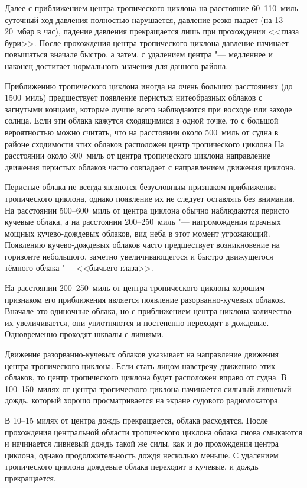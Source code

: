 Далее с приближением центра тропического циклона на расстояние
60--110~миль суточный ход давления полностью нарушается, давление
резко падает (на 13--20~мбар в час), падение давления прекращается лишь
при прохождении <<глаза бури>>. После прохождения центра тропического
циклона давление начинает повышаться вначале быстро, а затем, с
удалением центра "--- медленнее и наконец достигает нормального значения
для данного района.

 Приближению тропического циклона иногда на очень больших
расстояниях (до 1500~миль) предшествует появление перистых
нитеобразных облаков с загнутыми концами, которые лучше всего
наблюдаются при восходе или заходе солнца. Если эти облака кажутся
сходящимися в одной точке, то с большой вероятностью можно считать,
что на расстоянии около 500~миль от судна в районе сходимости этих
облаков расположен центр тропического циклона На расстоянии около 300~миль
от центра тропического циклона направление движения перистых
облаков часто совпадает с направлением движения циклона.

Перистые облака не всегда являются безусловным признаком приближения
тропического циклона, однако появление их не следует оставлять без
внимания. На расстоянии 500--600~миль от центра циклона обычно
наблюдаются перисто кучевые облака, а на расстоянии 200--250~миль "---
нагромождения мрачных мощных кучево-дождевых облаков, вид неба в этот
момент угрожающий. Появлению кучево-дождевых облаков часто
предшествует возникновение на горизонте небольшого, заметно
увеличивающегося и быстро движущегося тёмного облака "--- <<бычьего
глаза>>.

На расстоянии 200--250~миль от центра тропического циклона хорошим
признаком его приближения является появление разорванно-кучевых
облаков. Вначале это одиночные облака, но с приближением центра
циклона количество их увеличивается, они уплотняются и постепенно
переходят в дождевые. Одновременно проходят шквалы с ливнями.

Движение разорванно-кучевых облаков указывает на направление движения
центра тропического циклона. Если стать лицом навстречу движению этих
облаков, то центр тропического циклона будет расположен вправо от
судна. В 100--150~милях от центра тропического циклона начинается
сильный ливневый дождь, который хорошо просматривается на экране
судового радиолокатора.

В 10--15 милях от центра дождь прекращается, облака расходятся. После
прохождения центральной области тропического циклона облака снова
смыкаются и начинается ливневый дождь такой же силы, как и до
прохождения центра циклона, однако продолжительность дождя несколько
меньше. С удалением тропического циклона дождевые облака переходят в
кучевые, и дождь прекращается.

